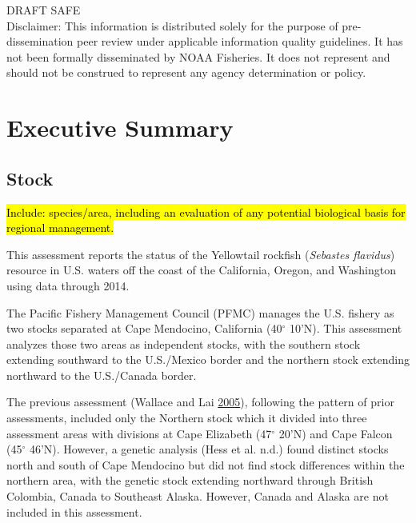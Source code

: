 \documentclass[12pt,]{article}
\begin{document}
\begin{center}
\vfill
DRAFT SAFE\\
Disclaimer: This information is distributed solely for the purpose of pre-dissemination
peer review under applicable information quality guidelines. It has not been formally
disseminated by NOAA Fisheries. It does not represent and should not be construed to
represent any agency determination or policy. 

\vspace{.3cm}

\maketitle

\setcounter{page}{1}
\end{center}

{
\setcounter{tocdepth}{4}
\tableofcontents
}
\setlength{\parskip}{5mm plus1mm minus1mm} \pagebreak

 \setcounter{page}{1}
\renewcommand{\thefigure}{\alph{figure}}
\renewcommand{\thetable}{\alph{table}}

\section*{Executive Summary}\label{executive-summary}

\subsection*{Stock}\label{stock}

\hl{Include: species/area, including an evaluation of any potential biological basis 
for regional management.}

This assessment reports the status of the Yellowtail rockfish
(\emph{Sebastes flavidus}) resource in U.S. waters off the coast of the
California, Oregon, and Washington using data through 2014.

The Pacific Fishery Management Council (PFMC) manages the U.S. fishery
as two stocks separated at Cape Mendocino, California (40\(^\circ\)
10'N). This assessment analyzes those two areas as independent stocks,
with the southern stock extending southward to the U.S./Mexico border
and the northern stock extending northward to the U.S./Canada border.

The previous assessment (Wallace and Lai
\protect\hyperlink{ref-Wallace2005}{2005}), following the pattern of
prior assessments, included only the Northern stock which it divided
into three assessment areas with divisions at Cape Elizabeth
(47\(^\circ\) 20'N) and Cape Falcon (45\(^\circ\) 46'N). However, a
genetic analysis (Hess et al. n.d.) found distinct stocks north and
south of Cape Mendocino but did not find stock differences within the
northern area, with the genetic stock extending northward through
British Colombia, Canada to Southeast Alaska. However, Canada and Alaska
are not included in this assessment.
\end{document}
